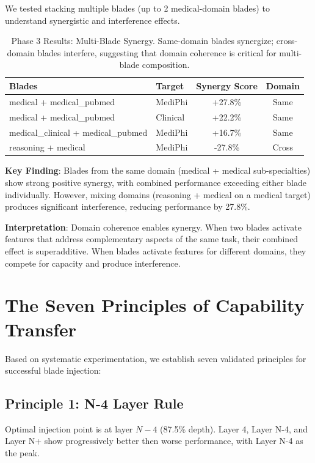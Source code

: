 \documentclass[11pt,a4paper]{article}
\begin{document}
We tested stacking multiple blades (up to 2 medical-domain blades) to understand synergistic and interference effects.

\begin{table}[ht]
\centering
\begin{tabular}{llcc}
\toprule
\textbf{Blades} & \textbf{Target} & \textbf{Synergy Score} & \textbf{Domain} \\
\midrule
medical + medical\_pubmed & MediPhi & +27.8\% & Same \\
medical + medical\_pubmed & Clinical & +22.2\% & Same \\
medical\_clinical + medical\_pubmed & MediPhi & +16.7\% & Same \\
reasoning + medical & MediPhi & -27.8\% & Cross \\
\bottomrule
\end{tabular}
\caption{Phase 3 Results: Multi-Blade Synergy. Same-domain blades synergize; cross-domain blades interfere, suggesting that domain coherence is critical for multi-blade composition.}
\label{tab:phase3}
\end{table}

\textbf{Key Finding}: Blades from the same domain (medical + medical sub-specialties) show strong positive synergy, with combined performance exceeding either blade individually. However, mixing domains (reasoning + medical on a medical target) produces significant interference, reducing performance by 27.8\%.

\textbf{Interpretation}: Domain coherence enables synergy. When two blades activate features that address complementary aspects of the same task, their combined effect is superadditive. When blades activate features for different domains, they compete for capacity and produce interference.

\section{The Seven Principles of Capability Transfer}

Based on systematic experimentation, we establish seven validated principles for successful blade injection:

\subsection{Principle 1: N-4 Layer Rule}
Optimal injection point is at layer $N-4$ (87.5\% depth). Layer 4, Layer N-4, and Layer N+ show progressively better then worse performance, with Layer N-4 as the peak.
\end{document}
